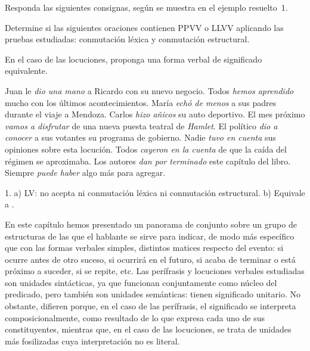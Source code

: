 \begin{ejercicio}\label{ej:11-locuciones}
Responda las siguientes consignas, según se muestra en el ejemplo resuelto~1.

\begin{consignas}
  \item Determine si las siguientes oraciones contienen PPVV o LLVV aplicando las
        pruebas estudiadas: conmutación léxica y conmutación estructural.
  \item En el caso de las locuciones, proponga una forma verbal de significado
        equivalente.
\end{consignas}

\begin{exe}
  \ex Juan le \textit{dio una mano} a Ricardo con su nuevo negocio.
  \ex Todos \textit{hemos aprendido} mucho con los últimos acontecimientos.
  \ex María \textit{echó de menos} a sus padres durante el viaje a Mendoza.
  \ex Carlos \textit{hizo añicos} su auto deportivo.
  \ex El mes próximo \textit{vamos a disfrutar} de una nueva puesta teatral de
      \textit{Hamlet}.
  \ex El político \textit{dio a conocer} a sus votantes su programa de gobierno.
  \ex Nadie \textit{tuvo en cuenta} sus opiniones sobre esta locución.
  \ex Todos \textit{cayeron en la cuenta} de que la caída del régimen se
      aproximaba.
  \ex Los autores \textit{dan por terminado} este capítulo del libro.
  \ex Siempre \textit{puede haber} algo más para agregar.
\end{exe}

\begin{resuelto}
1. a) LV: no acepta ni conmutación léxica ni conmutación estructural. b)
Equivale a .
\end{resuelto}
\end{ejercicio}

\begin{recuadro}
En este capítulo hemos presentado un panorama de conjunto sobre un grupo de
estructuras de las que el hablante se sirve para indicar, de modo más específico
que con las formas verbales simples, distintos matices respecto del evento: si
ocurre antes de otro suceso, si ocurrirá en el futuro, si acaba de terminar o
está próximo a suceder, si se repite, etc. Las perífrasis y locuciones verbales
estudiadas son unidades sintácticas, ya que funcionan conjuntamente como núcleo
del predicado, pero también son unidades semánticas: tienen significado
unitario. No obstante, difieren porque, en el caso de las perífrasis, el
significado se interpreta composicionalmente, como resultado de lo que expresa
cada uno de sus constituyentes, mientras que, en el caso de las locuciones, se
trata de unidades más fosilizadas cuya interpretación no es literal.
\end{recuadro}

